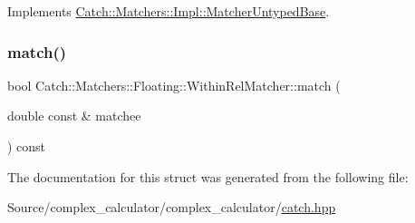 Implements \mbox{\hyperlink{class_catch_1_1_matchers_1_1_impl_1_1_matcher_untyped_base_a91d3a907dbfcbb596077df24f6e11fe2}{Catch\+::\+Matchers\+::\+Impl\+::\+Matcher\+Untyped\+Base}}.

\mbox{\label{struct_catch_1_1_matchers_1_1_floating_1_1_within_rel_matcher_ac4fc68ff316028137a6d940e10d78e12}} 
\subsubsection{\texorpdfstring{match()}{match()}}
{\footnotesize\ttfamily bool Catch\+::\+Matchers\+::\+Floating\+::\+Within\+Rel\+Matcher\+::match (\begin{DoxyParamCaption}\item[{double const \&}]{matchee }\end{DoxyParamCaption}) const\hspace{0.3cm}{\ttfamily [override]}}



The documentation for this struct was generated from the following file\+:\begin{DoxyCompactItemize}
\item 
Source/complex\+\_\+calculator/complex\+\_\+calculator/\mbox{\hyperlink{catch_8hpp}{catch.\+hpp}}\end{DoxyCompactItemize}

